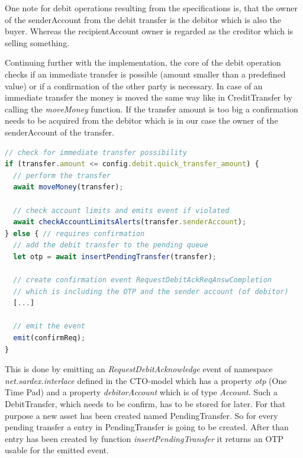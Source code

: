 One note for debit operations resulting from the specifications is, that the owner of the senderAccount from the debit transfer is the debitor which is also the buyer. Whereas the recipientAccount owner is regarded as the creditor which is selling something.

Continuing further with the implementation, the core of the debit operation checks if an immediate transfer is possible (amount smaller than a predefined value) or if a confirmation of the other party is necessary. In case of an immediate transfer the money is moved the same way like in CreditTransfer by calling the \textit{moveMoney} function. If the transfer amount is too big a confirmation needs to be acquired from the debitor which is in our case the owner of the senderAccount of the transfer.

\begin{center}
\begin{minipage}{0.8\textwidth}
\small
\begin{lstlisting}[language=javascript,firstnumber=1,caption={\bf\small DebitTransfer JavaScript}, captionpos=b,label=lst:js-debittransfer]
// check for immediate transfer possibility
if (transfer.amount <= config.debit.quick_transfer_amount) {
  // perform the transfer
  await moveMoney(transfer);

  // check account limits and emits event if violated
  await checkAccountLimitsAlerts(transfer.senderAccount);
} else { // requires confirmation
  // add the debit transfer to the pending queue
  let otp = await insertPendingTransfer(transfer);

  // create confirmation event RequestDebitAckReqAnswCompletion
  // which is including the OTP and the sender account (of debitor)
  [...]

  // emit the event
  emit(confirmReq);
}
\end{lstlisting}
\end{minipage}
\end{center}

This is done by emitting an \textit{RequestDebitAcknowledge} event of namespace \textit{net.sardex.interlace} defined in the CTO-model which has a property \textit{otp} (One Time Pad) and a property \textit{debitorAccount} which is of type \textit{Account}. Such a DebitTransfer, which needs to be confirm, has to be stored for later. For that purpose a new asset has been created named PendingTransfer. So for every pending transfer a entry in PendingTransfer is going to be created. After than entry has been created by function \textit{insertPendingTransfer} it returns an OTP usable for the emitted event.

